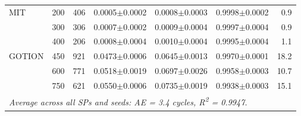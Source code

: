 \begin{table}[htbp]
\begin{tabular}{lr rrrrr}
MIT & 200 & 406 & 0.0005$\pm$0.0002 & 0.0008$\pm$0.0003 & 0.9998$\pm$0.0002 & 0.9 \\
  & 300 & 306 & 0.0007$\pm$0.0002 & 0.0009$\pm$0.0004 & 0.9997$\pm$0.0004 & 0.9 \\
  & 400 & 206 & 0.0008$\pm$0.0004 & 0.0010$\pm$0.0004 & 0.9995$\pm$0.0004 & 1.1 \\
GOTION & 450 & 921 & 0.0473$\pm$0.0006 & 0.0645$\pm$0.0013 & 0.9970$\pm$0.0001 & 18.2 \\
  & 600 & 771 & 0.0518$\pm$0.0019 & 0.0697$\pm$0.0026 & 0.9958$\pm$0.0003 & 10.7 \\
  & 750 & 621 & 0.0550$\pm$0.0006 & 0.0735$\pm$0.0019 & 0.9938$\pm$0.0003 & 15.1 \\
\midrule
\multicolumn{7}{l}{\emph{Average across all SPs and seeds: AE = 3.4 cycles, R\textsuperscript{2} = 0.9947.}} \\
\bottomrule
\end{tabular}
\end{table}

